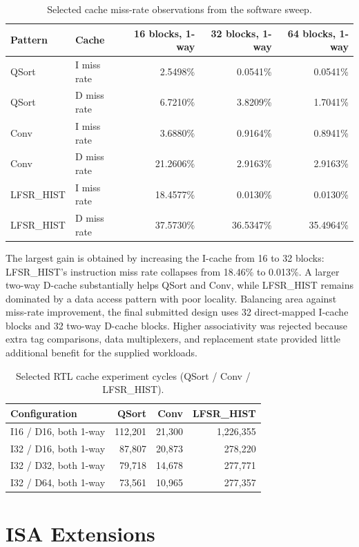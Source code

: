 \documentclass[11pt,a4paper]{article}
\begin{document}
\begin{table}[h]
\centering
\caption{Selected cache miss-rate observations from the software sweep.}
\label{tab:cache-sweep}
\begin{tabular}{llrrr}
\toprule
Pattern & Cache & 16 blocks, 1-way & 32 blocks, 1-way & 64 blocks, 1-way\\
\midrule
QSort & I miss rate & 2.5498\% & 0.0541\% & 0.0541\%\\
QSort & D miss rate & 6.7210\% & 3.8209\% & 1.7041\%\\
Conv & I miss rate & 3.6880\% & 0.9164\% & 0.8941\%\\
Conv & D miss rate & 21.2606\% & 2.9163\% & 2.9163\%\\
LFSR\_HIST & I miss rate & 18.4577\% & 0.0130\% & 0.0130\%\\
LFSR\_HIST & D miss rate & 37.5730\% & 36.5347\% & 35.4964\%\\
\bottomrule
\end{tabular}
\end{table}

The largest gain is obtained by increasing the I-cache from 16 to 32 blocks:
LFSR\_HIST's instruction miss rate collapses from 18.46\% to 0.013\%.  A larger
two-way D-cache substantially helps QSort and Conv, while LFSR\_HIST remains
dominated by a data access pattern with poor locality.  Balancing area against
miss-rate improvement, the final submitted design uses 32 direct-mapped
I-cache blocks and 32 two-way D-cache blocks.  Higher
associativity was rejected because extra tag comparisons, data multiplexers,
and replacement state provided little additional benefit for the supplied
workloads.

\begin{table}[h]
\centering
\caption{Selected RTL cache experiment cycles (QSort / Conv / LFSR\_HIST).}
\begin{tabular}{lrrr}
\toprule
Configuration & QSort & Conv & LFSR\_HIST\\
\midrule
I16 / D16, both 1-way & 112,201 & 21,300 & 1,226,355\\
I32 / D16, both 1-way & 87,807 & 20,873 & 278,220\\
I32 / D32, both 1-way & 79,718 & 14,678 & 277,771\\
I32 / D64, both 1-way & 73,561 & 10,965 & 277,357\\
\bottomrule
\end{tabular}
\end{table}

\section{ISA Extensions}
\end{document}
